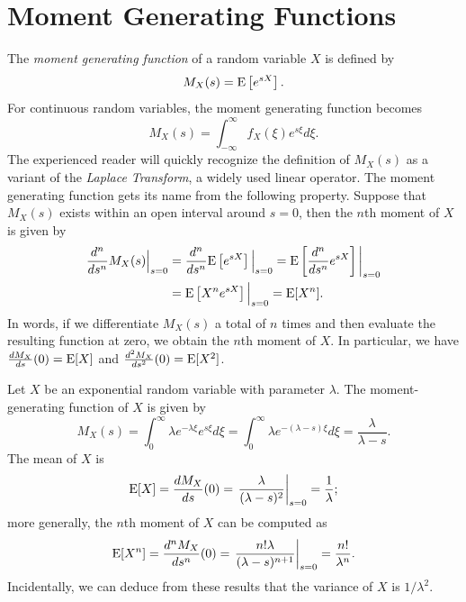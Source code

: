 \section{Moment Generating Functions}

The \emph{moment generating function} of a random variable $X$ is defined by
\begin{equation*}
M_X (s) = \mathrm{E} \left[ e^{s X} \right] .
\end{equation*}
For continuous random variables, the moment generating function becomes
\begin{equation*}
M_X (s) = \int_{-\infty}^{\infty} f_X (\xi) e^{s \xi} d\xi .
\end{equation*}
The experienced reader will quickly recognize the definition of $M_X(s)$ as a variant of the \emph{Laplace Transform}, a widely used linear operator.
The moment generating function gets its name from the following property.
Suppose that $M_X(s)$ exists within an open interval around $s = 0$, then the $n$th moment of $X$ is given by
\begin{equation*}
\begin{split}
\frac{d^n}{ds^n} M_X (s) \Big|_{s=0}
&= \frac{d^n}{ds^n} \mathrm{E} \left[ e^{s X} \right] \Big|_{s=0}
= \mathrm{E} \left[ \frac{d^n}{ds^n} e^{s X} \right] \bigg|_{s=0} \\
&= \mathrm{E} \left[ X^n e^{s X} \right] \Big|_{s=0}
= \mathrm{E} [X^n] .
\end{split}
\end{equation*}
In words, if we differentiate $M_X(s)$ a total of $n$ times and then evaluate the resulting function at zero, we obtain the $n$th moment of $X$.
In particular, we have $\frac{d M_X}{ds}(0) = \mathrm{E} [X]$ and $\frac{d^2 M_X}{ds^2}(0) = \mathrm{E} [X^2]$.

\begin{example}
Let $X$ be an exponential random variable with parameter $\lambda$.
The moment-generating function of $X$ is given by
\begin{equation*}
M_X (s) = \int_0^{\infty} \lambda e^{-\lambda \xi} e^{s\xi} d\xi
= \int_0^{\infty} \lambda e^{-(\lambda-s) \xi} d\xi
= \frac{\lambda}{\lambda - s} .
\end{equation*}
The mean of $X$ is
\begin{equation*}
\mathrm{E} [X] = \frac{d M_X }{ds} (0)
= \left. \frac{\lambda}{(\lambda - s)^2} \right|_{s=0}
= \frac{1}{\lambda} ;
\end{equation*}
more generally, the $n$th moment of $X$ can be computed as
\begin{equation*}
\mathrm{E} [X^n] = \frac{d^n M_X }{ds^n} (0)
= \left. \frac{n! \lambda}{(\lambda - s)^{n+1}} \right|_{s=0}
= \frac{n!}{\lambda^n} .
\end{equation*}
Incidentally, we can deduce from these results that the variance of $X$ is $1/\lambda^2$.
\end{example}

